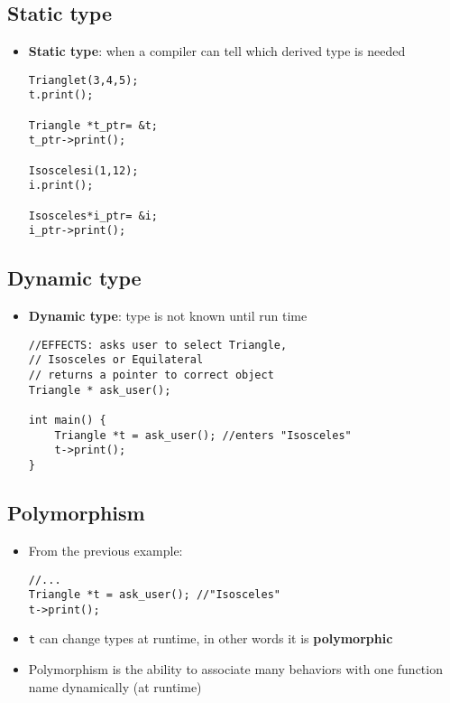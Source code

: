 \subsection{Static type}
\begin{itemize}
	\item \textbf{Static type}: when a compiler can tell which derived type is needed
\begin{lstlisting}[style=C++]
Trianglet(3,4,5);
t.print();

Triangle *t_ptr= &t;
t_ptr->print();

Isoscelesi(1,12);
i.print();

Isosceles*i_ptr= &i;
i_ptr->print();
\end{lstlisting}
\end{itemize}

\subsection{Dynamic type}
\begin{itemize}
	\item \textbf{Dynamic type}: type is not known until run time 
\begin{lstlisting}[style=C++]
//EFFECTS: asks user to select Triangle,
// Isosceles or Equilateral
// returns a pointer to correct object
Triangle * ask_user();

int main() {
	Triangle *t = ask_user(); //enters "Isosceles"
	t->print();
}
\end{lstlisting}
\end{itemize}

\subsection{Polymorphism}
\begin{itemize}
	\item From the previous example:
\begin{lstlisting}[style=C++]
//...
Triangle *t = ask_user(); //"Isosceles"
t->print();
\end{lstlisting}
	\item \lstinline[style=C++]{t} can change types at runtime, in other words it is \textbf{polymorphic}
	\item Polymorphism is the ability to associate many behaviors with one function name dynamically (at runtime)
\end{itemize}

